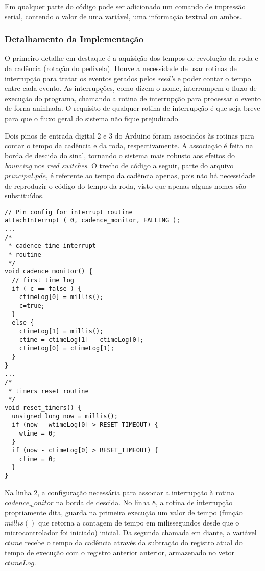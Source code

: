 \documentclass[a4paper,11pt]{article}
\begin{document}
Em qualquer parte do código pode ser adicionado um comando de impressão serial,
contendo o valor de uma variável, uma informação textual ou ambos.

\subsubsection{Detalhamento da Implementação}
\label{sec:code_detail}
O primeiro detalhe em destaque é a aquisição dos tempos de revolução da roda e
da cadência (rotação do pedivela). Houve a necessidade de usar rotinas de
interrupção para tratar os eventos gerados pelos \textit{reed's} e poder contar
o tempo entre cada evento. As interrupções, como dizem o nome, interrompem o
fluxo de execução do programa, chamando a rotina de interrupção para processar
o evento de forna aninhada. O requisito de qualquer rotina de interrupção é que
seja breve para que o fluxo geral do sistema não fique prejudicado.

Dois pinos de entrada digital 2 e 3 do Arduino foram associados às
rotinas para contar o tempo da cadência e da roda, respectivamente. A
associação é feita na borda de descida do sinal, tornando o sistema mais
robusto aos efeitos do \textit{bouncing} nos \textit{reed switches}. O
trecho de código a seguir, parte do arquivo $principal.pde$, é referente ao
tempo da cadência apenas, pois não há necessidade de reproduzir o código do
tempo da roda, visto que apenas alguns nomes são substituídos.
\begin{lstlisting}
// Pin config for interrupt routine
attachInterrupt ( 0, cadence_monitor, FALLING );
...
/*
 * cadence time interrupt
 * routine
 */
void cadence_monitor() {
  // first time log
  if ( c == false ) {
    ctimeLog[0] = millis();
    c=true;
  }
  else {
    ctimeLog[1] = millis();
    ctime = ctimeLog[1] - ctimeLog[0];
    ctimeLog[0] = ctimeLog[1];
  }
}
...
/*
 * timers reset routine
 */
void reset_timers() {
  unsigned long now = millis();
  if (now - wtimeLog[0] > RESET_TIMEOUT) {
    wtime = 0;
  }
  if (now - ctimeLog[0] > RESET_TIMEOUT) {
    ctime = 0;
  }
}
\end{lstlisting}
Na linha 2, a configuração necessária para associar a interrupção à rotina
$cadence_monitor$ na borda de descida. No linha 8, a rotina de interrupção
propriamente dita, guarda na primeira execução um valor de tempo (função
$millis()$ que retorna a contagem de tempo em milissegundos desde que o
microcontrolador foi iniciado) inicial. Da segunda chamada em diante, a
variável $ctime$ recebe o tempo da cadência através da subtração do registro
atual do tempo de execução com o registro anterior anterior, armazenado no
vetor $ctimeLog$.
\end{document}
